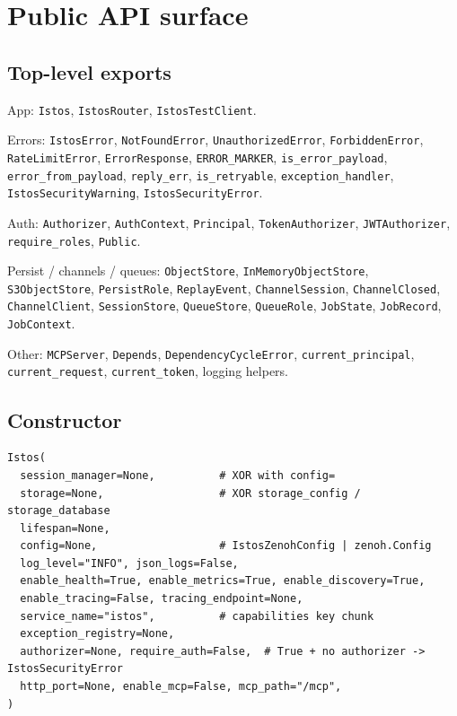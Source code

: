 \documentclass[11pt,a4paper]{article}
\begin{document}
\section{Public API surface}

\subsection{Top-level exports}

App: \texttt{Istos}, \texttt{IstosRouter}, \texttt{IstosTestClient}.

Errors: \texttt{IstosError}, \texttt{NotFoundError}, \texttt{UnauthorizedError},
\texttt{ForbiddenError}, \texttt{RateLimitError}, \texttt{ErrorResponse},
\texttt{ERROR\_MARKER}, \texttt{is\_error\_payload}, \texttt{error\_from\_payload},
\texttt{reply\_err}, \texttt{is\_retryable}, \texttt{exception\_handler},
\texttt{IstosSecurityWarning}, \texttt{IstosSecurityError}.

Auth: \texttt{Authorizer}, \texttt{AuthContext}, \texttt{Principal},
\texttt{TokenAuthorizer}, \texttt{JWTAuthorizer}, \texttt{require\_roles}, \texttt{Public}.

Persist / channels / queues: \texttt{ObjectStore}, \texttt{InMemoryObjectStore},
\texttt{S3ObjectStore}, \texttt{PersistRole}, \texttt{ReplayEvent},
\texttt{ChannelSession}, \texttt{ChannelClosed}, \texttt{ChannelClient},
\texttt{SessionStore}, \texttt{QueueStore}, \texttt{QueueRole}, \texttt{JobState},
\texttt{JobRecord}, \texttt{JobContext}.

Other: \texttt{MCPServer}, \texttt{Depends}, \texttt{DependencyCycleError},
\texttt{current\_principal}, \texttt{current\_request}, \texttt{current\_token},
logging helpers.

\subsection{Constructor}

\begin{lstlisting}
Istos(
  session_manager=None,          # XOR with config=
  storage=None,                  # XOR storage_config / storage_database
  lifespan=None,
  config=None,                   # IstosZenohConfig | zenoh.Config
  log_level="INFO", json_logs=False,
  enable_health=True, enable_metrics=True, enable_discovery=True,
  enable_tracing=False, tracing_endpoint=None,
  service_name="istos",          # capabilities key chunk
  exception_registry=None,
  authorizer=None, require_auth=False,  # True + no authorizer -> IstosSecurityError
  http_port=None, enable_mcp=False, mcp_path="/mcp",
)
\end{lstlisting}
\end{document}
